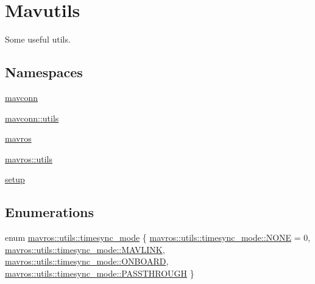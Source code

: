 \hypertarget{group__mavutils}{}\section{Mavutils}
\label{group__mavutils}


Some useful utils.  


\subsection*{Namespaces}
\begin{DoxyCompactItemize}
\item 
 \mbox{\hyperlink{namespacemavconn}{mavconn}}
\item 
 \mbox{\hyperlink{namespacemavconn_1_1utils}{mavconn\+::utils}}
\item 
 \mbox{\hyperlink{namespacemavros}{mavros}}
\item 
 \mbox{\hyperlink{namespacemavros_1_1utils}{mavros\+::utils}}
\item 
 \mbox{\hyperlink{namespacesetup}{setup}}
\end{DoxyCompactItemize}
\subsection*{Enumerations}
\begin{DoxyCompactItemize}
\item 
enum \mbox{\hyperlink{group__mavutils_gac7f53712a7627f397d0eb145c2a16cf7}{mavros\+::utils\+::timesync\+\_\+mode}} \{ \mbox{\hyperlink{group__mavutils_ggac7f53712a7627f397d0eb145c2a16cf7ab50339a10e1de285ac99d4c3990b8693}{mavros\+::utils\+::timesync\+\_\+mode\+::\+N\+O\+NE}} = 0, 
\mbox{\hyperlink{group__mavutils_ggac7f53712a7627f397d0eb145c2a16cf7a2b45d810cc872a32caa6e524d97e1bc1}{mavros\+::utils\+::timesync\+\_\+mode\+::\+M\+A\+V\+L\+I\+NK}}, 
\mbox{\hyperlink{group__mavutils_ggac7f53712a7627f397d0eb145c2a16cf7a1136c8e00bec79c43c2c579ef03e934f}{mavros\+::utils\+::timesync\+\_\+mode\+::\+O\+N\+B\+O\+A\+RD}}, 
\mbox{\hyperlink{group__mavutils_ggac7f53712a7627f397d0eb145c2a16cf7aeb8f4226b2bcd1848b8945edb9120428}{mavros\+::utils\+::timesync\+\_\+mode\+::\+P\+A\+S\+S\+T\+H\+R\+O\+U\+GH}}
 \}
\end{DoxyCompactItemize}
